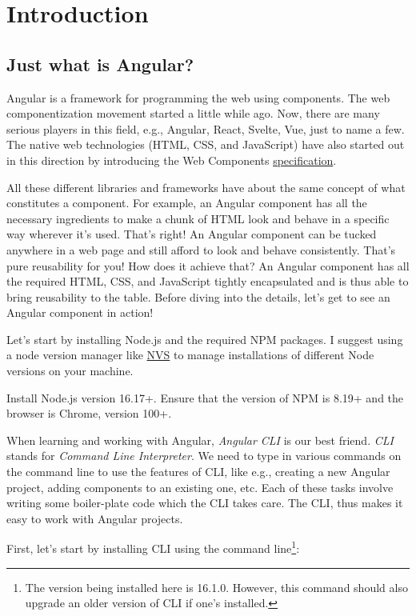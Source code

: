 \documentclass[10pt]{•}\documentclass{report}
\begin{document}
	\chapter{Introduction}
	\section{Just what is Angular?}
Angular is a framework for programming the web using components. The web componentization movement started a little while ago. Now, there are many serious players in this field, e.g., Angular, React, Svelte, Vue, just to name a few. The native web technologies (HTML, CSS, and JavaScript) have also started out in this direction by introducing the Web Components \href{https://www.webcomponents.org/specs}{specification}.

All these different libraries and frameworks have about the same concept of what constitutes a component. For example, an Angular component has all the necessary ingredients to make a chunk of HTML look and behave in a specific way wherever it's used. That's right! An Angular component can be tucked anywhere in a web page and still afford to look and behave consistently. That's pure reusability for you! How does it achieve that? An Angular component has all the required HTML, CSS, and JavaScript tightly encapsulated and is thus able to bring reusability to the table. Before diving into the details, let's get to see an Angular component in action!

Let's start by installing Node.js and the required NPM packages. I suggest using a node version manager like \href{https://github.com/jasongin/nvs}{NVS} to manage installations of different Node versions on your machine.

Install Node.js version 16.17+. Ensure that the version of NPM is 8.19+ and the browser is Chrome, version 100+.

When learning and working with Angular, \textsl{Angular CLI} is our best friend. \textsl{CLI} stands for \textsl{Command Line Interpreter}. We need to type in various commands on the command line to use the features of CLI, like e.g., creating a new Angular project, adding components to an existing one, etc. Each of these tasks involve writing some boiler-plate code which the CLI takes care. The CLI, thus makes it easy to work with Angular projects.

First, let's start by installing CLI using the command line\footnote{The version being installed here is 16.1.0. However, this command should also upgrade an older version of CLI if one's installed.}:
\end{document}

